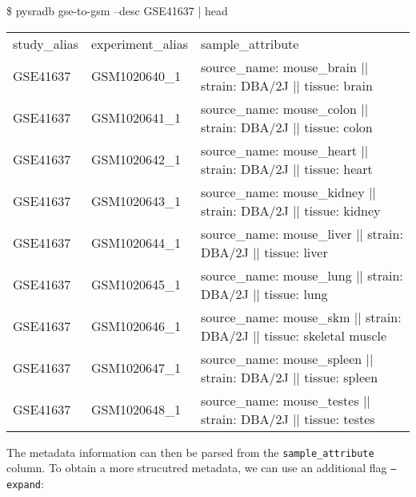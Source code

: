 \documentclass[9pt,a4paper]{extarticle}
\newenvironment{allintypewriter}{\ttfamily}{\par}
\begin{document}
\begin{allintypewriter}
\$ pysradb gse-to-gsm --desc GSE41637 | head\\
\begin{table}[H]
    \begin{tabular}{lll}
        study_alias & experiment_alias & sample_attribute\\
        GSE41637 & GSM1020640_1 &  source_name: mouse_brain || strain: DBA/2J || tissue: brain\\
        GSE41637 & GSM1020641_1 &  source_name: mouse_colon || strain: DBA/2J || tissue: colon\\
        GSE41637 & GSM1020642_1 &  source_name: mouse_heart || strain: DBA/2J || tissue: heart\\
        GSE41637 & GSM1020643_1 &  source_name: mouse_kidney || strain: DBA/2J || tissue: kidney\\
        GSE41637 & GSM1020644_1 &  source_name: mouse_liver || strain: DBA/2J || tissue: liver\\
        GSE41637 & GSM1020645_1 &  source_name: mouse_lung || strain: DBA/2J || tissue: lung\\
        GSE41637 & GSM1020646_1 &  source_name: mouse_skm || strain: DBA/2J || tissue: skeletal muscle\\
        GSE41637 & GSM1020647_1 &  source_name: mouse_spleen || strain: DBA/2J || tissue: spleen\\
        GSE41637 & GSM1020648_1 &  source_name: mouse_testes || strain: DBA/2J || tissue: testes\\
    \end{tabular}
\end{table}
\end{allintypewriter}

The metadata information can then be parsed from the \texttt{sample\_attribute} column.
To obtain a more strucutred metadata, we can use an additional flag \texttt{--expand}:
\end{document}
